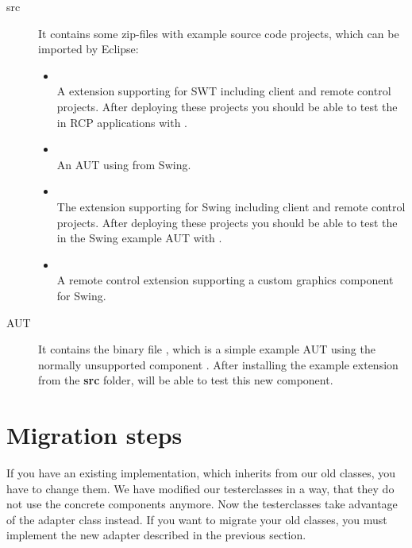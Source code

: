 \begin{description}
 \item[src] It contains some zip-files with example source code projects, which
            can be imported by Eclipse:
 \begin{itemize}
   \item {}\\
         A \app{} extension supporting  for SWT including client
         and remote control projects. After deploying these projects you should
         be able to test the  in RCP applications with \app{}.
   \item {}\\
         An AUT using  from Swing.
   \item {}\\
         The \app{} extension supporting  for Swing including
         client and remote control projects. After deploying these projects you
         should be able to test the  in the Swing example AUT
         with \app{}.
   \item {}\\
         A \app{} remote control extension supporting a custom graphics
         component for Swing.
 \end{itemize}
 \item[AUT] It contains the binary file , which is a simple
 example AUT using the normally unsupported component . After
 installing the  example extension from the \textbf{src}
 folder, \app{} will be able to test this new component.
\end{description}

\section{Migration steps}
If you have an existing implementation, which inherits from our old classes,
you have to change them. We have modified our testerclasses in a way, that they
do not use the concrete components anymore. Now the testerclasses take
advantage of the adapter class instead. If you want to migrate your old
classes, you must implement the new adapter described in the previous section.
